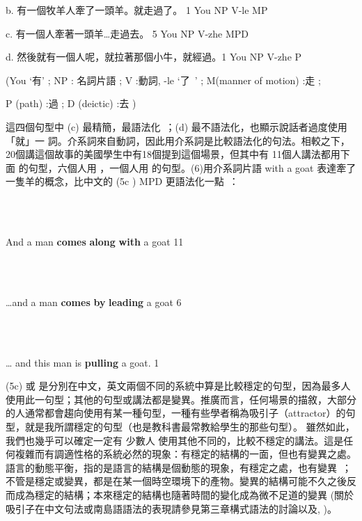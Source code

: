 b.  有一個牧羊人牽了一頭羊。就走過了。       1   You NP V-le MP          

c.  有一個人牽著一頭羊…走過去。             5   You NP V-zhe MPD

d.  然後就有一個人呢，就拉著那個小牛，就經過。1  You NP V-zhe  P                                                                             

(You ‘有’ ; NP : 名詞片語 ; V :動詞, -le ‘了~’ ;   M(manner of motion) :走 ; 

P (path) :過 ; D (deictic) :去 )~

這四個句型中 (c) 最精簡，最語法化~；(d) 最不語法化，也顯示說話者過度使用「就」一 詞。介系詞來自動詞，因此用介系詞是比較語法化的句法。相較之下，20個講這個故事的美國學生中有18個提到這個場景，但其中有 11個人講法都用下面 的句型，六個人用 ，一個人用  的句型。(6)用介系詞片語 with a goat  表達牽了一隻羊的概念，比中文的 (5c ) MPD 更語法化一點~：

\ea%
\label{ex:key:6}
\gll\\
\\
\glt
\z

And a man \textbf{comes} \textbf{along} \textbf{with} a goat         11

\ea%
\label{ex:key:7}
\gll\\
\\
\glt
\z

…and a man \textbf{comes} \textbf{by} \textbf{leading} a goat        6

\ea%
\label{ex:key:8}
\gll\\
\\
\glt
\z

… and this man is \textbf{pulling} a goat.             1

(5c) 或  是分別在中文，英文兩個不同的系統中算是比較穩定的句型，因為最多人使用此一句型；其他的句型或講法都是變異。推廣而言，任何場景的描敘，大部分的人通常都會趨向使用有某一種句型，一種有些學者稱為吸引子（attractor）的句型，就是我所謂穩定的句型（也是教科書最常教給學生的那些句型）。 雖然如此，我們也幾乎可以確定一定有 少數人 使用其他不同的，比較不穩定的講法。這是任何複雜而有調適性格的系統必然的現象：有穩定的結構的一面，但也有變異之處。語言的動態平衡，指的是語言的結構是個動態的現象，有穩定之處，也有變異~；不管是穩定或變異，都是在某一個時空環境下的產物。變異的結構可能不久之後反而成為穩定的結構；本來穩定的結構也隨著時間的變化成為微不足道的變異 (關於吸引子在中文句法或南島語語法的表現請參見第三章構式語法的討論以及\citealt{Huang2013}, \citealt{Huang2017})。 

